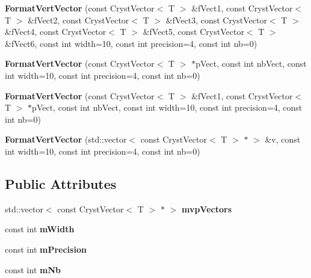 \begin{DoxyCompactItemize}
\item 
\mbox{\label{class_format_vert_vector_a32fdfef8ee30aa2e8bf6081a324233dc}} 
{\bfseries Format\+Vert\+Vector} (const Cryst\+Vector$<$ T $>$ \&f\+Vect1, const Cryst\+Vector$<$ T $>$ \&f\+Vect2, const Cryst\+Vector$<$ T $>$ \&f\+Vect3, const Cryst\+Vector$<$ T $>$ \&f\+Vect4, const Cryst\+Vector$<$ T $>$ \&f\+Vect5, const Cryst\+Vector$<$ T $>$ \&f\+Vect6, const int width=10, const int precision=4, const int nb=0)
\item 
\mbox{\label{class_format_vert_vector_a4e0ba2f99aaab4e1c9cf21b75d2fd69a}} 
{\bfseries Format\+Vert\+Vector} (const Cryst\+Vector$<$ T $>$ $\ast$p\+Vect, const int nb\+Vect, const int width=10, const int precision=4, const int nb=0)
\item 
\mbox{\label{class_format_vert_vector_adf7f5bda998e63d8aecfe88127719934}} 
{\bfseries Format\+Vert\+Vector} (const Cryst\+Vector$<$ T $>$ \&f\+Vect1, const Cryst\+Vector$<$ T $>$ $\ast$p\+Vect, const int nb\+Vect, const int width=10, const int precision=4, const int nb=0)
\item 
\mbox{\label{class_format_vert_vector_ac911194986464935863f331d4c32b559}} 
{\bfseries Format\+Vert\+Vector} (std\+::vector$<$ const Cryst\+Vector$<$ T $>$ $\ast$ $>$ \&v, const int width=10, const int precision=4, const int nb=0)
\end{DoxyCompactItemize}
\subsection*{Public Attributes}
\begin{DoxyCompactItemize}
\item 
\mbox{\label{class_format_vert_vector_a5ff5e892064c8296c9c3609da849ab3e}} 
std\+::vector$<$ const Cryst\+Vector$<$ T $>$ $\ast$ $>$ {\bfseries mvp\+Vectors}
\item 
\mbox{\label{class_format_vert_vector_a0ea4d4aae7292f4e5421558156f4ba9e}} 
const int {\bfseries m\+Width}
\item 
\mbox{\label{class_format_vert_vector_ad64d9a4b653d32862fa7abcc08972249}} 
const int {\bfseries m\+Precision}
\item 
\mbox{\label{class_format_vert_vector_a6105c029947810220b069538f1b1a961}} 
const int {\bfseries m\+Nb}
\end{DoxyCompactItemize}


